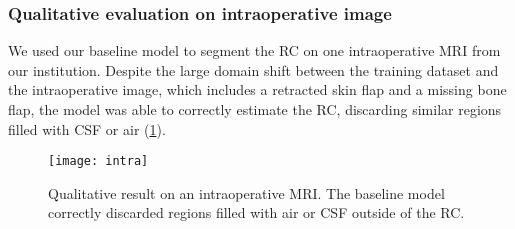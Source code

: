 \subsubsection{Qualitative evaluation on intraoperative image}

We used our baseline model to segment the \ac{RC} on one intraoperative \ac{MRI} from our institution.
Despite the large domain shift between the training dataset and the intraoperative image, which includes a retracted skin flap and a missing bone flap, the model was able to correctly estimate the \ac{RC}, discarding similar regions filled with \ac{CSF} or air (\cref{fig:intra}).

\begin{figure}
  \centering
  \texttt{[image: intra]}
  \caption{
    Qualitative result on an intraoperative \ac{MRI}.
    The baseline model correctly discarded regions filled with air or \ac{CSF} outside of the \ac{RC}.
  }
  \label{fig:intra}
\end{figure}
